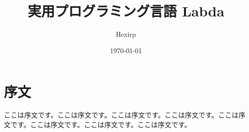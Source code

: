 \documentclass[book]{jlreq}
\title{実用プログラミング言語 Labda}
\author{Hexirp}
\date{\today}
\begin{document}
\maketitle

\chapter*{序文}

ここは序文です。ここは序文です。ここは序文です。ここは序文です。ここは序文です。ここは序文です。ここは序文です。ここは序文です。
\end{document}
